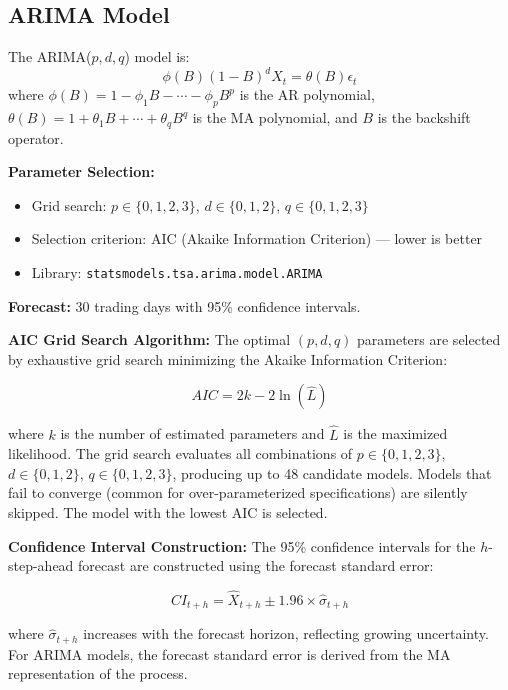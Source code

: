 \documentclass[12pt, a4paper, oneside]{report}
\begin{document}
\subsection{ARIMA Model}

The ARIMA($p,d,q$) model is:
\begin{equation}
    \phi(B)(1-B)^d X_t = \theta(B)\epsilon_t
\end{equation}
where $\phi(B) = 1 - \phi_1 B - \cdots - \phi_p B^p$ is the AR polynomial, $\theta(B) = 1 + \theta_1 B + \cdots + \theta_q B^q$ is the MA polynomial, and $B$ is the backshift operator.

\textbf{Parameter Selection:}
\begin{itemize}[nosep]
    \item Grid search: $p \in \{0,1,2,3\}$, $d \in \{0,1,2\}$, $q \in \{0,1,2,3\}$
    \item Selection criterion: AIC (Akaike Information Criterion) --- lower is better
    \item Library: \texttt{statsmodels.tsa.arima.model.ARIMA}
\end{itemize}

\textbf{Forecast:} 30 trading days with 95\% confidence intervals.

\textbf{AIC Grid Search Algorithm:}
The optimal $(p, d, q)$ parameters are selected by exhaustive grid search minimizing the Akaike Information Criterion:

\begin{equation}
    AIC = 2k - 2\ln(\hat{L})
\end{equation}

where $k$ is the number of estimated parameters and $\hat{L}$ is the maximized likelihood. The grid search evaluates all combinations of $p \in \{0,1,2,3\}$, $d \in \{0,1,2\}$, $q \in \{0,1,2,3\}$, producing up to 48 candidate models. Models that fail to converge (common for over-parameterized specifications) are silently skipped. The model with the lowest AIC is selected.

\textbf{Confidence Interval Construction:}
The 95\% confidence intervals for the $h$-step-ahead forecast are constructed using the forecast standard error:

\begin{equation}
    CI_{t+h} = \hat{X}_{t+h} \pm 1.96 \times \hat{\sigma}_{t+h}
\end{equation}

where $\hat{\sigma}_{t+h}$ increases with the forecast horizon, reflecting growing uncertainty. For ARIMA models, the forecast standard error is derived from the MA representation of the process.
\end{document}
